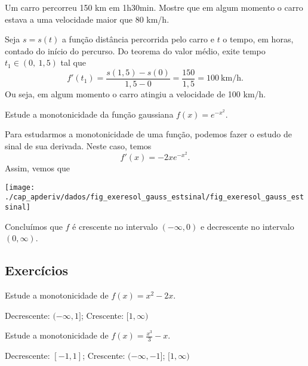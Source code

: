 \begin{exeresol}
  Um carro percorreu 150 km em 1h30min. Mostre que em algum momento o carro estava a uma velocidade maior que 80 km/h.
\end{exeresol}
\begin{resol}
  Seja $s=s(t)$ a função distância percorrida pelo carro e $t$ o tempo, em horas, contado do início do percurso. Do teorema do valor médio, exite tempo $t_1\in (0,~1,5)$ tal que
  \begin{equation}
    f'(t_1) = \frac{s(1,5)-s(0)}{1,5-0} = \frac{150}{1,5} = 100~\text{km/h}.
  \end{equation}
  Ou seja, em algum momento o carro atingiu a velocidade de 100 km/h.
\end{resol}

\begin{exeresol}
  Estude a monotonicidade da função gaussiana $f(x) = e^{-x^2}$.  
\end{exeresol}
\begin{resol}
  Para estudarmos a monotonicidade de uma função, podemos fazer o estudo de sinal de sua derivada. Neste caso, temos
  \begin{equation}
    f'(x) = -2xe^{-x^2}.
  \end{equation}
  Assim, vemos que
  \begin{center}
    \texttt{[image: ./cap\_apderiv/dados/fig\_exeresol\_gauss\_estsinal/fig\_exeresol\_gauss\_estsinal]}
  \end{center}
  Concluímos que $f$ é crescente no intervalo $(-\infty, 0)$ e decrescente no intervalo $(0, \infty)$.
\end{resol}

\subsection{Exercícios}

\begin{exer}
  Estude a monotonicidade de $f(x) = x^2 - 2x$.
\end{exer}
\begin{resp}
  Decrescente: $(-\infty, 1]$; Crescente: $[1, \infty)$
\end{resp}

\begin{exer}
  Estude a monotonicidade de $\displaystyle f(x) = \frac{x^3}{3}-x$.
\end{exer}
\begin{resp}
  Decrescente: $[-1, 1]$; Crescente: $(-\infty, -1]$; $[1, \infty)$
\end{resp}

